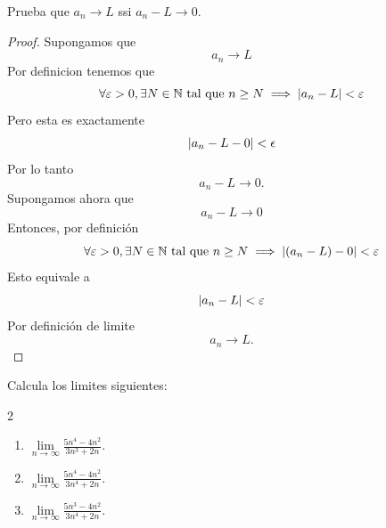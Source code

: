 \documentclass[12pt,a4paper]{article}
\begin{document}
    \begin{mdframed}[style=mdbluebox,frametitle={Ejercicio 6}]
        Prueba que $a_{n}\to L$ ssi $a_{n}-L\to0$.
    \end{mdframed}

    \begin{proof}
        Supongamos que
        \begin{equation*}
            a_{n}\to L
        \end{equation*}
        Por definicion tenemos que
        \begin{equation*}
            \forall\varepsilon>0,\exists N\in\mathbb{N}\text{ tal que }n\geq N\implies\abs{a_{n}-L}<\varepsilon
        \end{equation*}
        Pero esta es exactamente
        \begin{equation*}
            \abs{a_{n}-L-0}<\epsilon
        \end{equation*}
        Por lo tanto
        \begin{equation*}
            a_{n}-L \to0.
        \end{equation*}
        Supongamos ahora que
        \begin{equation*}
            a_{n}-L\to0
        \end{equation*}
        Entonces, por definición
        \begin{equation*}
            \forall\varepsilon>0,\exists N\in\mathbb{N}\text{ tal que }n\geq N\implies\abs{(a_{n}-L)-0}<\varepsilon
        \end{equation*}
        Esto equivale a
        \begin{equation*}
            \abs{a_{n}-L}<\varepsilon
        \end{equation*}
        Por definición de limite
        \begin{equation*}
            a_{n}\to L.
        \end{equation*}
    \end{proof}

    \begin{mdframed}[style=mdbluebox,frametitle={Ejercicio 7}]
        Calcula los limites siguientes:
        \begin{multicols}{2}
            \begin{enumerate}
                \item[(a)]  $\underset{n\rightarrow\infty}{\lim}\frac{5n^{4}-4n^{2}}{3n^{3}+2n}.$
                \vspace{0.1cm}
                \item[(b)]  $\underset{n\rightarrow\infty}{\lim}\frac{5n^{4}-4n^{2}}{3n^{4}+2n}.$
                \vspace{0.1cm}
                \item[(c)]  $\underset{n\rightarrow\infty}{\lim}\frac{5n^{3}-4n^{2}}{3n^{4}+2n}.$
            \end{enumerate}
        \end{multicols}
    \end{mdframed}
\end{document}
